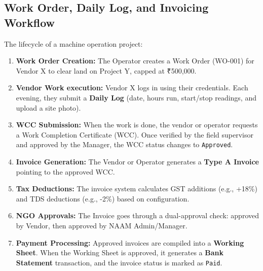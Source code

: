 \documentclass[11pt,a4paper]{article}
\begin{document}
\subsection{Work Order, Daily Log, and Invoicing Workflow}
The lifecycle of a machine operation project:
\begin{enumerate}
    \item \textbf{Work Order Creation:} The Operator creates a Work Order (WO-001) for Vendor X to clear land on Project Y, capped at ₹500,000.
    \item \textbf{Vendor Work execution:} Vendor X logs in using their credentials. Each evening, they submit a \textbf{Daily Log} (date, hours run, start/stop readings, and upload a site photo).
    \item \textbf{WCC Submission:} When the work is done, the vendor or operator requests a Work Completion Certificate (WCC). Once verified by the field supervisor and approved by the Manager, the WCC status changes to \texttt{Approved}.
    \item \textbf{Invoice Generation:} The Vendor or Operator generates a \textbf{Type A Invoice} pointing to the approved WCC.
    \item \textbf{Tax Deductions:} The invoice system calculates GST additions (e.g., +18\%) and TDS deductions (e.g., -2\%) based on configuration.
    \item \textbf{NGO Approvals:} The Invoice goes through a dual-approval check: approved by Vendor, then approved by NAAM Admin/Manager.
    \item \textbf{Payment Processing:} Approved invoices are compiled into a \textbf{Working Sheet}. When the Working Sheet is approved, it generates a \textbf{Bank Statement} transaction, and the invoice status is marked as \texttt{Paid}.
\end{enumerate}

\newpage
\end{document}
